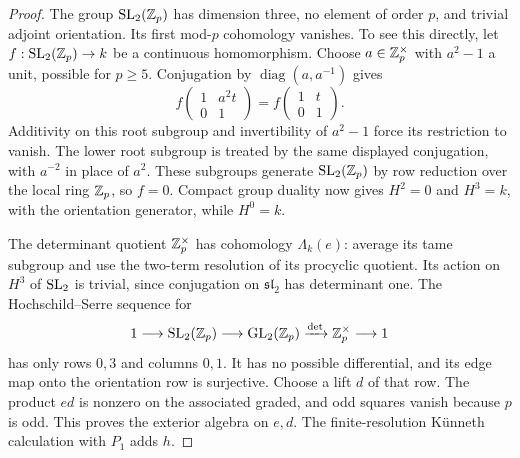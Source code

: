 \begin{proof}
The group $\operatorname{SL}_2(\mathbb Z_p)$ has dimension three, no element of order
$p$, and trivial adjoint orientation.  Its first mod-$p$ cohomology
vanishes.  To see this directly, let $f:\operatorname{SL}_2(\mathbb Z_p)\to k$ be a
continuous homomorphism.  Choose $a\in\mathbb Z_p^\times$ with
$a^2-1$ a unit, possible for $p\geq5$.  Conjugation by
$\operatorname{diag}(a,a^{-1})$ gives
\[
 f\left(\begin{smallmatrix}1&a^2t\\0&1\end{smallmatrix}\right)
   =f\left(\begin{smallmatrix}1&t\\0&1\end{smallmatrix}\right).
\]
Additivity on this root subgroup and invertibility of $a^2-1$
force its restriction to vanish.  The lower root subgroup is treated
by the same displayed conjugation, with $a^{-2}$ in place of $a^2$.
These subgroups generate $\operatorname{SL}_2(\mathbb Z_p)$ by row reduction over the
local ring $\mathbb Z_p$, so $f=0$.
Compact group duality now gives $H^2=0$ and $H^3=k$, with the
orientation generator, while $H^0=k$.

The determinant quotient $\mathbb Z_p^\times$ has cohomology
$\Lambda_k(e)$: average its tame subgroup and use the two-term
resolution of its procyclic quotient.  Its action on $H^3$ of
$\operatorname{SL}_2$ is trivial, since conjugation on $\mathfrak{sl}_2$ has
determinant one.  The Hochschild--Serre sequence for
\[
 1\longrightarrow\operatorname{SL}_2(\mathbb Z_p)\longrightarrow\operatorname{GL}_2(\mathbb Z_p)
 \xrightarrow{\det}\mathbb Z_p^\times\longrightarrow1
\]
has only rows $0,3$ and columns $0,1$.  It has no possible
differential, and its edge map onto the orientation row is surjective.
Choose a lift $d$ of that row.  The product $ed$ is nonzero on
the associated graded, and odd squares vanish because $p$ is odd.
This proves the exterior algebra on $e,d$.  The finite-resolution
K\"unneth calculation with $P_1$ adds $h$.


\end{proof}
